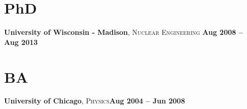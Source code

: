 \documentclass[margin,line]{resume}
\begin{document}
\begin{resume}
    \section{\mysidestyle PhD}
    \textbf{University of Wisconsin - Madison}, \textsc{Nuclear 
        Engineering}\hfill \textbf{ Aug 2008 -- Aug 
        2013}\vspace{-3mm}\\\vspace{-4mm}%
    \section{\mysidestyle BA}
    \textbf{University of Chicago}, \textsc{Physics}\hfill\textbf{Aug 2004 -- 
        Jun 2008}\vspace{-3mm}\\\vspace{-4mm}%

\end{resume}
\end{document}
